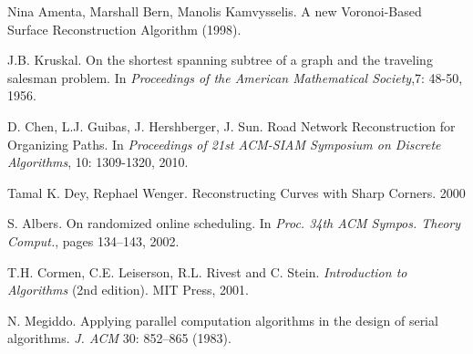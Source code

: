\documentclass[11pt]{article}
\begin{document}
\begin{thebibliography}{50}

Nina Amenta, Marshall Bern, Manolis Kamvysselis.
A new Voronoi-Based Surface Reconstruction Algorithm
(1998).

J.B. Kruskal.
On the shortest spanning subtree of a graph and the traveling salesman problem.
In \emph{Proceedings of the American Mathematical Society},7: 48-50, 1956.

D. Chen, L.J. Guibas, J. Hershberger, J. Sun.
Road Network Reconstruction for Organizing Paths.
In \emph{Proceedings  of  21st  ACM-SIAM  Symposium  on  Discrete  Algorithms}, 10: 1309-1320, 2010.


Tamal K. Dey, Rephael Wenger.
Reconstructing Curves with Sharp Corners.
2000



S. Albers.
On randomized online scheduling.
In \emph{Proc. 34th ACM Sympos. Theory Comput.}, pages 134--143, 2002.

T.H. Cormen, C.E. Leiserson, R.L. Rivest and C. Stein.
\emph{Introduction to Algorithms} (2nd edition).
MIT Press, 2001.

N. Megiddo.
Applying parallel computation algorithms in the design of serial algorithms.
\emph{J. ACM} 30: 852--865 (1983).

\end{thebibliography}
\end{document}
